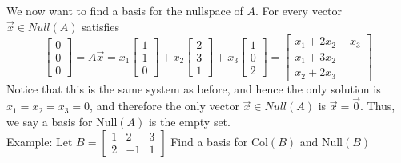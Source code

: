 \documentclass[10pt,letter]{article}
\begin{document}
We now want to find a basis for the nullspace of $A$. For every vector $\vec{x}\in Null(A)$ satisfies $$\begin{bmatrix}0\\0\\0\end{bmatrix}=A\vec{x}=x_1\begin{bmatrix}1\\1\\0\end{bmatrix}+x_2\begin{bmatrix}2\\3\\1\end{bmatrix}+x_3\begin{bmatrix}1\\0\\2\end{bmatrix}=\begin{bmatrix}x_1+2x_2+x_3\\x_1+3x_2\\x_2+2x_3\end{bmatrix}$$ Notice that this is the same system as before, and hence the only solution is $x_1=x_2=x_3=0$, and therefore the only vector $\vec{x}\in Null(A)$ is $\vec{x}=\vec{0}$. Thus, we say a basis for Null$(A)$ is the empty set. \\ 
Example: Let $B=\begin{bmatrix}1&2&3\\2&-1&1\end{bmatrix}$ Find a basis for Col$(B)$ and Null$(B)$ \\ 
\end{document}
